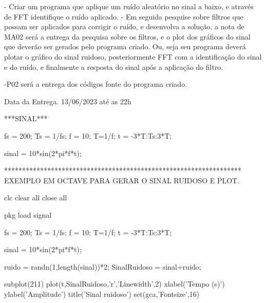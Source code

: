 - Criar um programa que aplique um ruído aleatório no sinal a baixo, e através de FFT identifique o ruído aplicado.
- Em seguida pesquise sobre filtros que possam ser aplicados para corrigir o ruído, e desenvolva a solução.
a nota de MA02 será a entrega da pesquisa sobre os filtros, e o plot dos gráficos do sinal que deverão ser gerados pelo programa criado. Ou, seja seu programa deverá plotar o gráfico do sinal ruidoso, posteriormente FFT com a identificação do sinal e do ruído, e finalmente a resposta do sinal após a aplicação do filtro.

-P02 será a entrega dos códigos fonte do programa criado.

Data da Entrega. 
13/06/2023 até as 22h


***SINAL***

fs = 200; %
Ts = 1/fs; %
f = 10; %
T=1/f; %
t = -3*T:Ts:3*T; %

sinal = 10*sin(2*pi*f*t);


******************************************************************
EXEMPLO EM OCTAVE PARA GERAR O SINAL RUIDOSO E PLOT.

clc
clear all
close all

pkg load signal

fs = 200; %
Ts = 1/fs; %
f = 10; %
T=1/f; %
t = -3*T:Ts:3*T; %

sinal = 10*sin(2*pi*f*t);


ruido = randn(1,length(sinal))*2;
SinalRuidoso = sinal+ruido;

subplot(211)
plot(t,SinalRuidoso,'r','Linewidth',2)
xlabel('Tempo (s)')
ylabel('Amplitude')
title('Sinal ruidoso')
set(gca,'Fontsize',16)